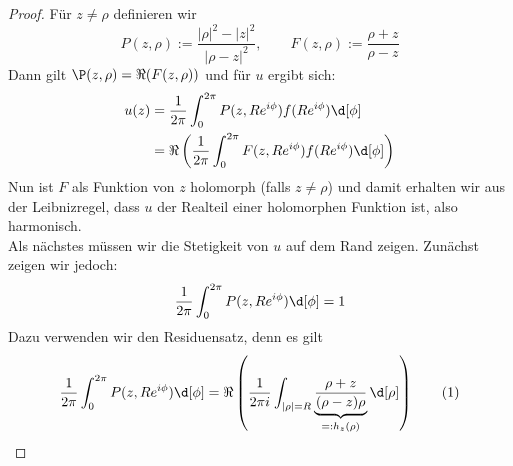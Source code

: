 \begin{proof}
  Für $z \neq \rho$ definieren wir
  \[
  P(z, \rho) := \frac{|\rho|^2 - |z|^2}{|\rho - z|^2}, \qquad
  F(z,\rho) := \frac{\rho +z }{\rho - z}
  \]
  Dann gilt $\P(z, \rho) = \Re(F(z, \rho))$ und für $u$ ergibt sich:
  \begin{align*}
    u(z) & = \frac{1}{2\pi} \int_0^{2\pi} P(z, Re^{i\phi})
    f(Re^{i\phi}) \d[\phi] \\
    & = \Re \left ( \frac{1}{2\pi} \int_0^{2\pi} F(z, Re^{i\phi})
      f(Re^{i\phi}) \d[\phi] \right ) \\
  \end{align*}
  Nun ist $F$ als Funktion von $z$ holomorph (falls $z \neq \rho$)
  und damit erhalten wir aus der Leibnizregel, dass $u$ der Realteil
  einer holomorphen Funktion ist, also harmonisch. \\
  Als nächstes müssen wir die Stetigkeit von $u$ auf dem Rand
  zeigen. Zunächst zeigen wir jedoch:
  \[
  \frac{1}{2\pi} \int_0^{2\pi} P(z, Re^{i\phi}) \d[\phi] = 1
  \]
  Dazu verwenden wir den Residuensatz, denn es gilt
  \[
  \frac{1}{2\pi} \int_0^{2\pi} P(z, Re^{i\phi}) \d[\phi]
  = \Re \left ( \frac{1}{2\pi i} \int_{|\rho| = R} \underbrace{
      \frac{\rho + z}{(\rho - z)\rho}}_{=:h_z(\rho)} \d[\rho] \right
  ) \label{eq:residuensatz} \tag{1}
  \]
  

\end{proof}
